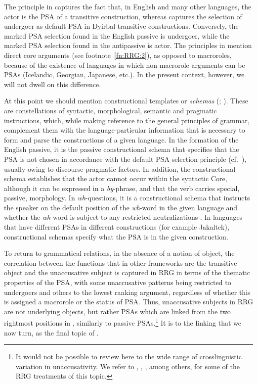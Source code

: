 \documentclass[output=paper,hidelinks]{langscibook}
\begin{document}
\noindent The principle in  captures the fact that, in English and many other languages, the actor is the PSA of a transitive construction, whereas  captures the selection of undergoer as default PSA in Dyirbal transitive constructions. Conversely, the marked PSA selection found in the English passive is undergoer, while the marked PSA selection found in the antipassive is actor. The principles in  mention direct core arguments (see footnote~\ref{fn:RRG:2}), as opposed to macroroles, because of the existence of languages in which non-macrorole arguments can be PSAs (Icelandic, Georgian, Japanese, etc.). In the present context, however, we will not dwell on this difference.

  At this point we should mention constructional templates or \textit{schemas} (\citealt[430-436]{VanValin1997}; \citealt[132-135]{VanValin2005}). These are constellations of syntactic, morphological, semantic and pragmatic instructions, which, while making reference to the general principles of grammar, complement them with the language-particular information that is necessary to form and parse the constructions of a given language. In the formation of the English passive, it is the passive constructional schema that specifies that the PSA is not chosen in accordance with the default PSA selection principle (cf.\ ), usually owing to discourse-pragmatic factors. In addition, the constructional schema establishes that the actor cannot occur within the syntactic Core, although it can be expressed in a \textit{by}{}-phrase, and that the verb carries special, passive, morphology. In \textit{wh}{}-questions, it is a constructional schema that instructs the speaker on the default position of the \textit{wh}{}-word in the given language and whether the \textit{wh}{}-word is subject to any restricted neutralizations \citep[132-133]{VanValin2005}. In languages that have different PSAs in different constructions (for example Jakaltek), constructional schemas specify what the PSA is in the given construction.

  To return to grammatical relations, in the absence of a notion of object, the correlation between the functions that in other frameworks are the transitive object and the unaccusative subject is captured in RRG in terms of the thematic properties of the PSA, with some unaccusative patterns being restricted to undergoers and others to the lowest ranking argument, regardless of whether this is assigned a macrorole or the status of PSA. Thus, unaccusative subjects in RRG are not underlying objects, but rather PSAs which are linked from the two rightmost positions in , similarly to passive PSAs.\footnote{It would not be possible to review here to the wide range of crosslinguistic variation in unaccusativity. We refer to \citet{Centineo1986,Centineo1995}, \citet{VanValin1990}, \citet{Bentley2006}, among others, for some of the RRG treatments of this topic.}  It is to the linking that we now turn, as the final topic of .
\end{document}

